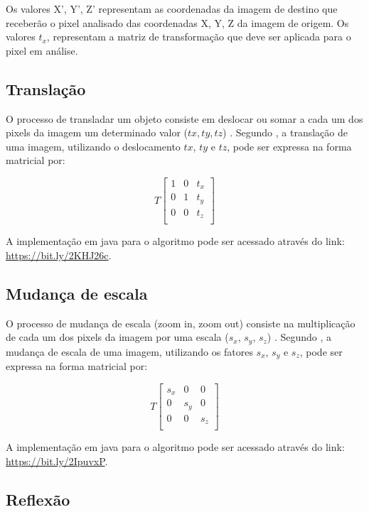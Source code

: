 \documentclass[
	12pt,				%
	oneside,			%
	a4paper,			%
	english,			%
	french,				%
	spanish,			%
	brazil,				%
	]{abntex2}
\begin{document}
Os valores X’, Y’, Z' representam as coordenadas da imagem de destino que receberão o pixel analisado das coordenadas X, Y, Z da imagem de origem. Os valores \(t_x\), representam a matriz de transformação que deve ser aplicada para o pixel em análise.

\subsection{Translação}

O processo de transladar um objeto consiste em deslocar ou somar a cada um dos pixels da imagem um determinado valor (\(tx, ty, tz\)) \cite{conciAzevedoLeta:2008}. Segundo \citet{pedriniSchwartz:2008}, a translação de uma imagem, utilizando o deslocamento \(tx\), \(ty\) e \(tz\), pode ser expressa na forma matricial por:

\[
T
\begin{bmatrix}
    1 & 0 & t_x   \\ 
    0 & 1 & t_y   \\    
    0 & 0 & t_z   \\    
\end{bmatrix} 
\]

A implementação em java para o algoritmo pode ser acessado através do link: \url{https://bit.ly/2KHJ26c}.

\subsection{Mudança de escala}

O processo de mudança de escala (zoom in, zoom out) consiste na multiplicação de cada um dos pixels da imagem por uma escala (\(s_x\), \(s_y\), \(s_z\))  \cite{conciAzevedoLeta:2008}. Segundo \citet{pedriniSchwartz:2008}, a mudança de escala de uma imagem, utilizando os fatores \(s_x\), \(s_y\) e \(s_z\), pode ser expressa na forma matricial por:

\[
T
\begin{bmatrix}
    s_x & 0   & 0     \\ 
	0   & s_y & 0     \\ 
	0   & 0   & s_z     \\ 
\end{bmatrix} 
\]

A implementação em java para o algoritmo pode ser acessado através do link: \url{https://bit.ly/2IpuvxP}.

\subsection{Reflexão}
\end{document}
